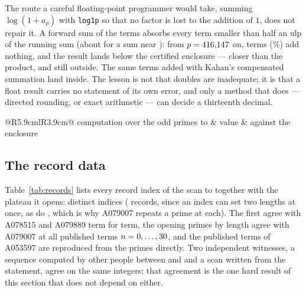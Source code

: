 \documentclass[11pt]{article}
\theoremstyle{definition}\newtheorem{observation}{Observation}
\begin{document}
The route a careful floating-point programmer would take, summing $\log(1+a_p)$ with \texttt{log1p} so that no factor is lost to the addition of $1$, does not repair it. A forward sum of the \NaivePrimes{} terms absorbs every term smaller than half an ulp of the running sum (about \HalfUlpOfSum{} for a sum near \LogSumApprox): from $p=416{,}147$ on, \LogOnePAbsorbed{} terms (\LogOnePAbsorbedPct\%) add nothing, and the result lands \LogOnePGap{} below the certified enclosure --- closer than the product, and still outside. The same terms added with Kahan's compensated summation \cite{Kahan65,Higham93} land inside. The lesson is not that doubles are inadequate; it is that a float result carries no statement of its own error, and only a method that does --- directed rounding, or exact arithmetic --- can decide a thirteenth decimal.

\begin{table}[h]\centering\footnotesize
\begin{tabular}{@{}R{5.9cm}lR{3.9cm}@{}}\toprule
computation over the odd primes to \NaiveLimit & value & against the enclosure\\\midrule
\MechanismRows
\bottomrule\end{tabular}
\caption{The mechanism, re-measured at every build. The certified enclosure at this loop bound already refutes the posted decimal and verifies the \CstarPubDecimals-decimal truncation \CstarCertTrunc{} of the true value.}\label{tab:mechanism}
\end{table}

\subsection{The record data}\label{sec:data}

Table~\ref{tab:records} lists every record index of the scan to \HLimit{} together with the plateau it opens: \HDistinct{} distinct indices (\HRecords{} records, since an index can set two lengths at once, as do \DoubleIndices, which is why A079007 repeats a prime at each). The first \OeisAgree{} agree with A078515 and A079889 term for term, the opening primes by length agree with A079007 at all \OeisBterms{} published terms $n=0,\dots,30$, and the \OeisCterms{} published terms of A053597 are reproduced from the primes directly. Two independent witnesses, a sequence computed by other people between \OeisFirstYear{} and \OeisLastYear{} and a scan written from the statement, agree on the same integers; that agreement is the one hard result of this section that does not depend on either.
\end{document}
